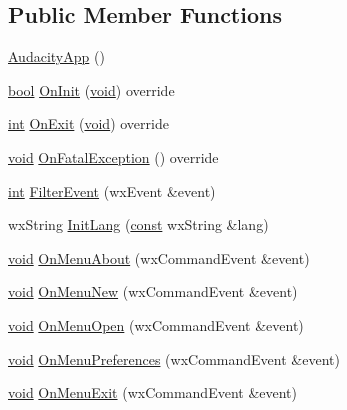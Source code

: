 \subsection*{Public Member Functions}
\begin{DoxyCompactItemize}
\item 
\hyperlink{class_audacity_app_aa27b7daaea956d250ca9cf7b0ea43037}{Audacity\+App} ()
\item 
\hyperlink{mac_2config_2i386_2lib-src_2libsoxr_2soxr-config_8h_abb452686968e48b67397da5f97445f5b}{bool} \hyperlink{class_audacity_app_a285f156873feac61aa4297d166e0f2c1}{On\+Init} (\hyperlink{sound_8c_ae35f5844602719cf66324f4de2a658b3}{void}) override
\item 
\hyperlink{xmltok_8h_a5a0d4a5641ce434f1d23533f2b2e6653}{int} \hyperlink{class_audacity_app_a9564abc8172532938f7205fe9cc8ca96}{On\+Exit} (\hyperlink{sound_8c_ae35f5844602719cf66324f4de2a658b3}{void}) override
\item 
\hyperlink{sound_8c_ae35f5844602719cf66324f4de2a658b3}{void} \hyperlink{class_audacity_app_a803c8274f9f7ead756cb99875ebe3ee7}{On\+Fatal\+Exception} () override
\item 
\hyperlink{xmltok_8h_a5a0d4a5641ce434f1d23533f2b2e6653}{int} \hyperlink{class_audacity_app_ab0e60c806e654235a1b3fb60c6b5664b}{Filter\+Event} (wx\+Event \&event)
\item 
wx\+String \hyperlink{class_audacity_app_a9aa53e5d0fe3321b95c34c3eb1b32b99}{Init\+Lang} (\hyperlink{getopt1_8c_a2c212835823e3c54a8ab6d95c652660e}{const} wx\+String \&lang)
\item 
\hyperlink{sound_8c_ae35f5844602719cf66324f4de2a658b3}{void} \hyperlink{class_audacity_app_a9b12e4a706af0d39c34ee5079c17c3f8}{On\+Menu\+About} (wx\+Command\+Event \&event)
\item 
\hyperlink{sound_8c_ae35f5844602719cf66324f4de2a658b3}{void} \hyperlink{class_audacity_app_ac4cb49358b654144dd674b7174e42ae2}{On\+Menu\+New} (wx\+Command\+Event \&event)
\item 
\hyperlink{sound_8c_ae35f5844602719cf66324f4de2a658b3}{void} \hyperlink{class_audacity_app_a76f647038ac425b0ffedec6a28760e76}{On\+Menu\+Open} (wx\+Command\+Event \&event)
\item 
\hyperlink{sound_8c_ae35f5844602719cf66324f4de2a658b3}{void} \hyperlink{class_audacity_app_a1a7433ef3b52505eda207d2dbbb72bed}{On\+Menu\+Preferences} (wx\+Command\+Event \&event)
\item 
\hyperlink{sound_8c_ae35f5844602719cf66324f4de2a658b3}{void} \hyperlink{class_audacity_app_a04c12a2f5a46cd6567895703e81444dc}{On\+Menu\+Exit} (wx\+Command\+Event \&event)

\end{DoxyCompactItemize}
